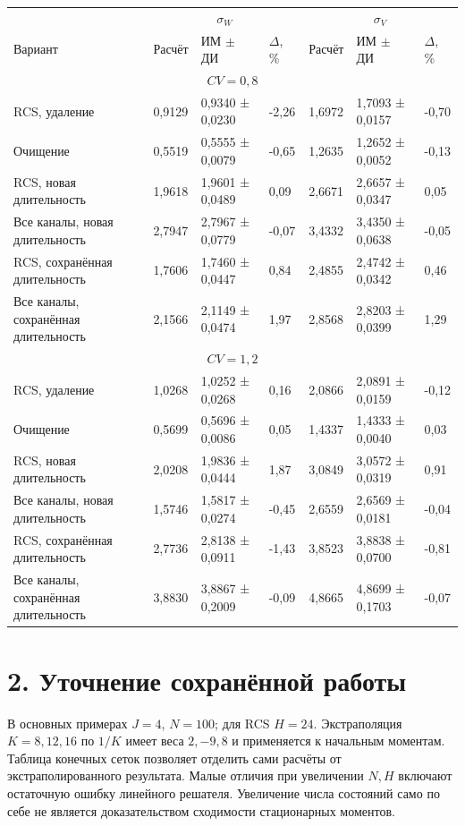 \setlength{\tabcolsep}{2pt}
\begin{tabular}{p{4.16cm}p{1.61cm}p{2.83cm}p{1.28cm}p{1.61cm}p{2.83cm}p{1.28cm}}
\toprule
 & \multicolumn{3}{c}{$\sigma_W$} & \multicolumn{3}{c}{$\sigma_V$} \\
Вариант & Расчёт & ИМ $\pm$ ДИ & $\Delta$, \% & Расчёт & ИМ $\pm$ ДИ & $\Delta$, \% \\
\midrule
\multicolumn{7}{c}{$CV=0,8$} \\
RCS, удаление & 0,9129 & 0,9340 ± 0,0230 & -2,26 & 1,6972 & 1,7093 ± 0,0157 & -0,70 \\
Очищение & 0,5519 & 0,5555 ± 0,0079 & -0,65 & 1,2635 & 1,2652 ± 0,0052 & -0,13 \\
RCS, новая длительность & 1,9618 & 1,9601 ± 0,0489 & 0,09 & 2,6671 & 2,6657 ± 0,0347 & 0,05 \\
Все каналы, новая длительность & 2,7947 & 2,7967 ± 0,0779 & -0,07 & 3,4332 & 3,4350 ± 0,0638 & -0,05 \\
RCS, сохранённая длительность & 1,7606 & 1,7460 ± 0,0447 & 0,84 & 2,4855 & 2,4742 ± 0,0342 & 0,46 \\
Все каналы, сохранённая длительность & 2,1566 & 2,1149 ± 0,0474 & 1,97 & 2,8568 & 2,8203 ± 0,0399 & 1,29 \\
\multicolumn{7}{c}{$CV=1,2$} \\
RCS, удаление & 1,0268 & 1,0252 ± 0,0268 & 0,16 & 2,0866 & 2,0891 ± 0,0159 & -0,12 \\
Очищение & 0,5699 & 0,5696 ± 0,0086 & 0,05 & 1,4337 & 1,4333 ± 0,0040 & 0,03 \\
RCS, новая длительность & 2,0208 & 1,9836 ± 0,0444 & 1,87 & 3,0849 & 3,0572 ± 0,0319 & 0,91 \\
Все каналы, новая длительность & 1,5746 & 1,5817 ± 0,0274 & -0,45 & 2,6559 & 2,6569 ± 0,0181 & -0,04 \\
RCS, сохранённая длительность & 2,7736 & 2,8138 ± 0,0911 & -1,43 & 3,8523 & 3,8838 ± 0,0700 & -0,81 \\
Все каналы, сохранённая длительность & 3,8830 & 3,8867 ± 0,2009 & -0,09 & 4,8665 & 4,8699 ± 0,1703 & -0,07 \\
\bottomrule
\end{tabular}




\section*{2. Уточнение сохранённой работы}
В основных примерах \(J=4\), \(N=100\); для RCS \(H=24\). Экстраполяция \(K=8,12,16\) по \(1/K\) имеет веса \(2,-9,8\) и применяется к начальным моментам. Таблица конечных сеток позволяет отделить сами расчёты от экстраполированного результата. Малые отличия при увеличении \(N,H\) включают остаточную ошибку линейного решателя. Увеличение числа состояний само по себе не является доказательством сходимости стационарных моментов.

